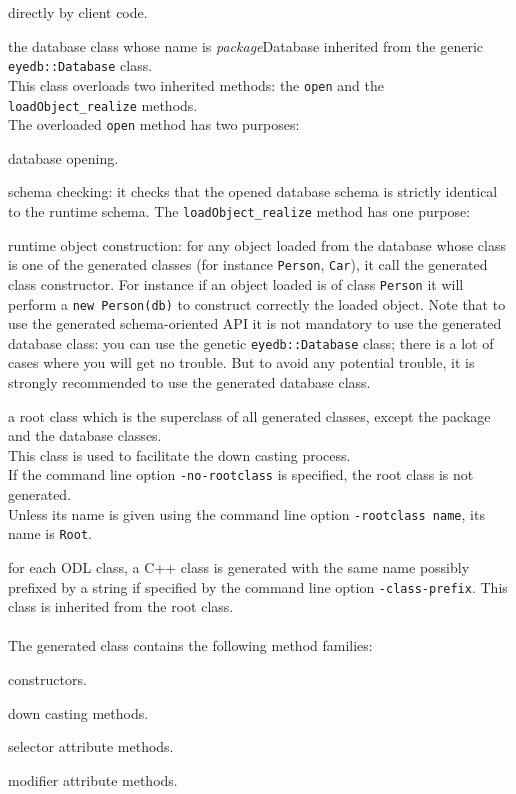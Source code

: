 directly by client code.
\ee
\item the database class whose name is \emph{package}Database inherited
from the generic \texttt{eyedb::Database} class.
\\
This class overloads two inherited methods: the \texttt{open} and the
\texttt{loadObject\_realize} methods.
\\
The overloaded \texttt{open} method has two purposes:
\bi
\item database opening.
\item schema checking: it checks that the opened database schema is strictly
identical to the runtime schema.
\ei
The \texttt{loadObject\_realize} method has one purpose:
\bi
\item runtime object construction: for any object loaded from the database
whose class is one of the generated classes
(for instance \texttt{Person}, \texttt{Car}), it call the generated
class constructor. For instance if an object loaded is of class \texttt{Person}
it will perform a \texttt{new Person(db)} to construct correctly
the loaded object.
\ei
Note that to use the generated schema-oriented API it is not mandatory
to use the generated database class: you can use the genetic \texttt{eyedb::Database}
class; there is a lot of cases where you will get no trouble.
But to avoid any potential trouble, it is strongly recommended to use the
generated database class.
\item a root class which is the superclass of
all generated classes, except the package and the database classes.
\\
This class is used to facilitate the down casting process.
\\
If the command line option \texttt{-no-rootclass} is specified, the root
class is not generated.
\\
Unless its name is given using the command line option \texttt{-rootclass name},
its name is \texttt{Root}.
\item for each ODL class, a C++ class is generated with the same name
possibly prefixed by a string if specified by the command line option
\texttt{-class-prefix}.
This class is inherited from the root class.
\\
\\
The generated class contains the following method families:
\be
\item constructors.
\item down casting methods.
\item selector attribute methods.
\item modifier attribute methods.
